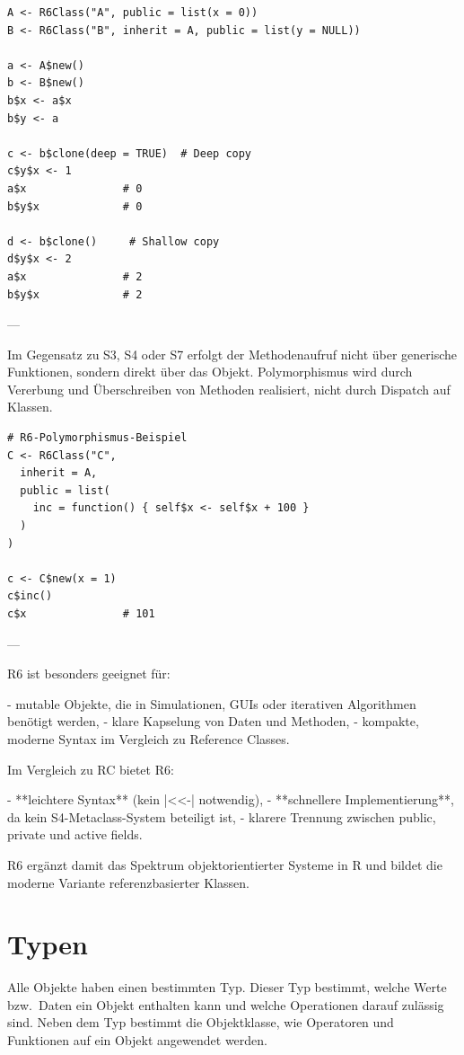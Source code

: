 \documentclass[10pt,twocolumn]{scrartcl}
\renewcommand{\lstinline}{\mycoloredinline}
\begin{document}
\begin{lstlisting}
A <- R6Class("A", public = list(x = 0))
B <- R6Class("B", inherit = A, public = list(y = NULL))

a <- A$new()
b <- B$new()
b$x <- a$x
b$y <- a

c <- b$clone(deep = TRUE)  # Deep copy
c$y$x <- 1
a$x               # 0
b$y$x             # 0

d <- b$clone()     # Shallow copy
d$y$x <- 2
a$x               # 2
b$y$x             # 2
\end{lstlisting}

---

Im Gegensatz zu S3, S4 oder S7 erfolgt der Methodenaufruf nicht über generische Funktionen, sondern direkt über das Objekt. Polymorphismus wird durch Vererbung und Überschreiben von Methoden realisiert, nicht durch Dispatch auf Klassen.

\begin{lstlisting}
# R6-Polymorphismus-Beispiel
C <- R6Class("C",
  inherit = A,
  public = list(
    inc = function() { self$x <- self$x + 100 }
  )
)

c <- C$new(x = 1)
c$inc()
c$x               # 101
\end{lstlisting}

---

R6 ist besonders geeignet für:

- mutable Objekte, die in Simulationen, GUIs oder iterativen Algorithmen benötigt werden,
- klare Kapselung von Daten und Methoden,
- kompakte, moderne Syntax im Vergleich zu Reference Classes.

Im Vergleich zu RC bietet R6:

- **leichtere Syntax** (kein \lstinline|<<-| notwendig),
- **schnellere Implementierung**, da kein S4-Metaclass-System beteiligt ist,
- klarere Trennung zwischen public, private und active fields.

R6 ergänzt damit das Spektrum objektorientierter Systeme in R und bildet die moderne Variante referenzbasierter Klassen.

\fi


\section{Typen}

Alle Objekte haben einen bestimmten Typ. Dieser Typ bestimmt, welche Werte bzw.\ Daten ein Objekt enthalten kann und welche Operationen darauf zulässig sind. Neben dem Typ bestimmt die Objektklasse, wie Operatoren und Funktionen auf ein Objekt angewendet werden.
\end{document}
